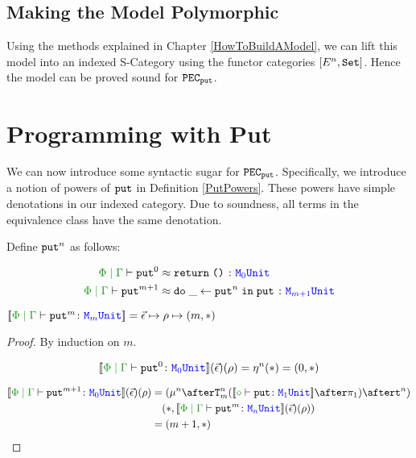 \subsection{Making the Model Polymorphic}
Using the methods explained in Chapter \ref{HowToBuildAModel}, we can lift this model into an indexed S-Category using the functor categories $[E^n, \texttt{Set}]$. Hence the model can be proved sound for $\texttt{PEC}_{\texttt{put}}$.
    

\section{Programming with Put}
We can now introduce some syntactic sugar for $\texttt{PEC}_{\texttt{put}}$. Specifically, we introduce a notion of powers of $\texttt{put}$ in Definition \ref{PutPowers}. These powers have simple denotations in our indexed category. Due to soundness, all terms in the equivalence class have the same denotation.

\begin{framed}
    \begin{definition}
        \label{PutPowers}
    Define $\texttt{put}^n$ as follows:
    
    \begin{align*}
        \label{PutnDefinition}
        \gpeberelation{\put^0}{&{\s}\return{\u}}{\M{0}{\U}}\\ 
        \gpeberelation{\put^{m+1}}{&{\s}\doin{\_}{\put^n}{\put}}{\M{m+1}{\U}}
    \end{align*}
    \end{definition}
\end{framed}


\begin{framed}
    \begin{lemma}
    $\deno{\gpetyperelation{\put^m}{\M{m}{\U}}} = \ev\mapsto\rho\mapsto(m, \singleton)$    
    \end{lemma}
    
    \begin{proof}
        By induction on $m$.
    
        
        \begin{equation}
            \deno{\gpetyperelation{\put^0}{\M{0}{\U}}}\fundRho = \pointn{}(\singleton) = (0, \singleton)
        \end{equation}
        
        \begin{align*}
            \deno{\gpetyperelation{\put^{m+1}}{\M{0}{\U}}}\fundRho & = (\bindmu^n\after\Tn{m}{(\deno{\typerelation{\nil}{\put}{\M{1}{\U}}}\after\p)}\after \strengtht^n)
            \\&\quad(\singleton, \deno{\gpetyperelation{\put^m}{\M{n}{\U}}}\fundRho)\\
            & = (m+1, \singleton)
        \end{align*}
    \end{proof}
\end{framed}



